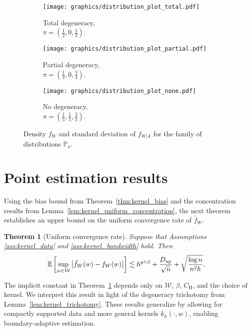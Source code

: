 \documentclass[11pt,lof]{puthesis}
\renewcommand{\P}{\ensuremath{\mathbb{P}}}
\newcommand{\E}{\ensuremath{\mathbb{E}}}
\newcommand{\rH}{\ensuremath{\mathrm{H}}}
\newcommand{\cW}{\ensuremath{\mathcal{W}}}
\newcommand{\Du}{\ensuremath{D_{\textup{up}}}}
\theoremstyle{break}
\newtheorem{theorem}{Theorem}[section]
\theoremstyle{proof}
\begin{document}
\begin{figure}[t]
\centering
%
\begin{subfigure}{0.32\textwidth}
\centering
\texttt{[image: graphics/distribution\_plot\_total.pdf]}
\caption{Total degeneracy, \\
$\pi = \left( \frac{1}{2}, 0, \frac{1}{2} \right)$.}
\end{subfigure}
%
\begin{subfigure}{0.32\textwidth}
\centering
\texttt{[image: graphics/distribution\_plot\_partial.pdf]}
\caption{Partial degeneracy, \\
$\pi = \left( \frac{1}{4}, 0, \frac{3}{4} \right)$.}
\end{subfigure}
%
\begin{subfigure}{0.32\textwidth}
\centering
\texttt{[image: graphics/distribution\_plot\_none.pdf]}
\caption{No degeneracy, \\
$\pi = \left( \frac{1}{5}, \frac{1}{5}, \frac{3}{5} \right)$.}
\end{subfigure}
%
\caption[The family of distributions $\P_\pi$]{
Density $f_W$ and standard deviation
of $f_{W|A}$ for the family of distributions $\P_\pi$.}
%
\label{fig:kernel_distribution}
\end{figure}

\section{Point estimation results}
\label{sec:kernel_point_estimation}

Using the bias bound from Theorem~\ref{thm:kernel_bias} and
the concentration results from Lemma~\ref{lem:kernel_uniform_concentration},
the next theorem establishes an upper bound on the uniform convergence rate of
$\hat f_W$.
%
\begin{theorem}[Uniform convergence rate]%
\label{thm:kernel_uniform_consistency}%
Suppose that Assumptions \ref{ass:kernel_data} and
\ref{ass:kernel_bandwidth} hold. Then
%
\begin{align*}
\E\left[
\sup_{w \in \cW}
\big|\hat{f}_W(w) - f_W(w)\big|
\right]
\lesssim
h^{p\wedge\beta} + \frac{\Du}{\sqrt n} + \sqrt{\frac{\log n}{n^2h}}.
\end{align*}
\end{theorem}
%
The implicit constant in Theorem~\ref{thm:kernel_uniform_consistency} depends
only on
$\cW$, $\beta$, $C_\rH$, and the choice of kernel. We interpret this result in
light of the degeneracy trichotomy from Lemma~\ref{lem:kernel_trichotomy}.
These results generalize \citet*[Theorem~1]{chiang2020empirical}
by allowing for compactly supported data and more general kernels
$k_h(\cdot,w)$, enabling boundary-adaptive estimation.
\end{document}
